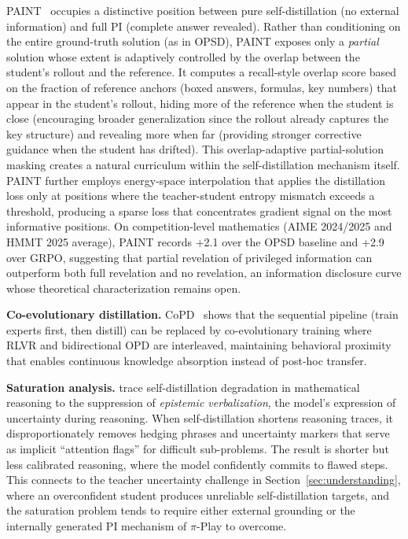 \documentclass{article} %
\begin{document}
PAINT~\citep{wang2026paint} occupies a distinctive position between pure self-distillation (no external information) and full PI (complete answer revealed). Rather than conditioning on the entire ground-truth solution (as in OPSD), PAINT exposes only a \emph{partial} solution whose extent is adaptively controlled by the overlap between the student's rollout and the reference. It computes a recall-style overlap score based on the fraction of reference anchors (boxed answers, formulas, key numbers) that appear in the student's rollout, hiding more of the reference when the student is close (encouraging broader generalization since the rollout already captures the key structure) and revealing more when far (providing stronger corrective guidance when the student has drifted). This overlap-adaptive partial-solution masking creates a natural curriculum within the self-distillation mechanism itself. PAINT further employs energy-space interpolation that applies the distillation loss only at positions where the teacher-student entropy mismatch exceeds a threshold, producing a sparse loss that concentrates gradient signal on the most informative positions. On competition-level mathematics (AIME 2024/2025 and HMMT 2025 average), PAINT records +2.1 over the OPSD baseline and +2.9 over GRPO, suggesting that partial revelation of privileged information can outperform both full revelation and no revelation, an information disclosure curve whose theoretical characterization remains open.

\textbf{Co-evolutionary distillation.} CoPD~\citep{gu2026copd} shows that the sequential pipeline (train experts first, then distill) can be replaced by co-evolutionary training where RLVR and bidirectional OPD are interleaved, maintaining behavioral proximity that enables continuous knowledge absorption instead of post-hoc transfer.

\textbf{Saturation analysis.} \citet{2603.24472} trace self-distillation degradation in mathematical reasoning to the suppression of \emph{epistemic verbalization}, the model's expression of uncertainty during reasoning. When self-distillation shortens reasoning traces, it disproportionately removes hedging phrases and uncertainty markers that serve as implicit ``attention flags'' for difficult sub-problems. The result is shorter but less calibrated reasoning, where the model confidently commits to flawed steps. This connects to the teacher uncertainty challenge in Section~\ref{sec:understanding}, where an overconfident student produces unreliable self-distillation targets, and the saturation problem tends to require either external grounding or the internally generated PI mechanism of $\pi$-Play to overcome.
\end{document}

